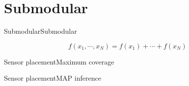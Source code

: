 \section{Submodular}

\begin{frame}{Submodular}{Submodular}
\begin{frame}
	\begin{block}{}
		\begin{equation}
		\nonumber
		f(x_{1} , \cdots , x_{N} )= f(x_{1}) + \cdots + f(x_{N})
		\end{equation}
	\end{block}
\end{frame}
\end{frame}

\begin{frame}{Sensor placement}{Maximum coverage}
	
\end{frame}

\begin{frame}{Sensor placement}{MAP inference}
	
\end{frame}
